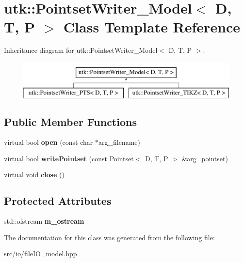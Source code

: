 \hypertarget{classutk_1_1PointsetWriter__Model}{\section{utk\-:\-:Pointset\-Writer\-\_\-\-Model$<$ D, T, P $>$ Class Template Reference}
\label{classutk_1_1PointsetWriter__Model}
}
Inheritance diagram for utk\-:\-:Pointset\-Writer\-\_\-\-Model$<$ D, T, P $>$\-:\begin{figure}[H]
\begin{center}
\leavevmode
\includegraphics[height=2.000000cm]{classutk_1_1PointsetWriter__Model}
\end{center}
\end{figure}
\subsection*{Public Member Functions}
\begin{DoxyCompactItemize}
\item 
\hypertarget{classutk_1_1PointsetWriter__Model_a47bb1b336edaddabff308f428ab1a74e}{virtual bool {\bfseries open} (const char $\ast$arg\-\_\-filename)}\label{classutk_1_1PointsetWriter__Model_a47bb1b336edaddabff308f428ab1a74e}

\item 
\hypertarget{classutk_1_1PointsetWriter__Model_aa14110717f4fbda93c93f3507c77c440}{virtual bool {\bfseries write\-Pointset} (const \hyperlink{classutk_1_1Pointset}{Pointset}$<$ D, T, P $>$ \&arg\-\_\-pointset)}\label{classutk_1_1PointsetWriter__Model_aa14110717f4fbda93c93f3507c77c440}

\item 
\hypertarget{classutk_1_1PointsetWriter__Model_a28c1a90fdb11c24390bab7ee304a92e8}{virtual void {\bfseries close} ()}\label{classutk_1_1PointsetWriter__Model_a28c1a90fdb11c24390bab7ee304a92e8}

\end{DoxyCompactItemize}
\subsection*{Protected Attributes}
\begin{DoxyCompactItemize}
\item 
\hypertarget{classutk_1_1PointsetWriter__Model_a339235f865e093d7b0f1273297273d2c}{std\-::ofstream {\bfseries m\-\_\-ostream}}\label{classutk_1_1PointsetWriter__Model_a339235f865e093d7b0f1273297273d2c}

\end{DoxyCompactItemize}


The documentation for this class was generated from the following file\-:\begin{DoxyCompactItemize}
\item 
src/io/file\-I\-O\-\_\-model.\-hpp\end{DoxyCompactItemize}
